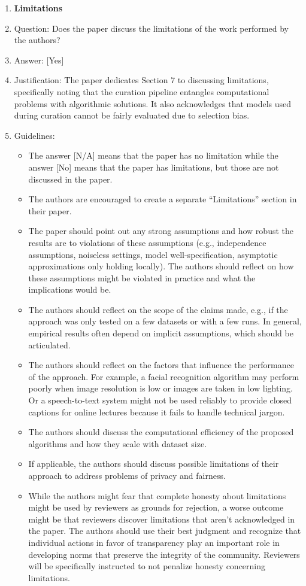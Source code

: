 \documentclass{llmxive}
\providecommand{\answerYes}[1][]{[Yes]#1}
\providecommand{\answerNo}[1][]{[No]#1}
\providecommand{\answerNA}[1][]{[N/A]#1}
\begin{document}
\begin{enumerate}
\item {\bf Limitations}
    \item[] Question: Does the paper discuss the limitations of the work performed by the authors?
    \item[] Answer: \answerYes{}
    \item[] Justification: The paper dedicates Section 7 to discussing limitations, specifically noting that the curation pipeline entangles computational problems with algorithmic solutions. It also acknowledges that models used during curation cannot be fairly evaluated due to selection bias.  
    \item[] Guidelines:
    \begin{itemize}
        \item The answer \answerNA{} means that the paper has no limitation while the answer \answerNo{} means that the paper has limitations, but those are not discussed in the paper. 
        \item The authors are encouraged to create a separate ``Limitations'' section in their paper.
        \item The paper should point out any strong assumptions and how robust the results are to violations of these assumptions (e.g., independence assumptions, noiseless settings, model well-specification, asymptotic approximations only holding locally). The authors should reflect on how these assumptions might be violated in practice and what the implications would be.
        \item The authors should reflect on the scope of the claims made, e.g., if the approach was only tested on a few datasets or with a few runs. In general, empirical results often depend on implicit assumptions, which should be articulated.
        \item The authors should reflect on the factors that influence the performance of the approach. For example, a facial recognition algorithm may perform poorly when image resolution is low or images are taken in low lighting. Or a speech-to-text system might not be used reliably to provide closed captions for online lectures because it fails to handle technical jargon.
        \item The authors should discuss the computational efficiency of the proposed algorithms and how they scale with dataset size.
        \item If applicable, the authors should discuss possible limitations of their approach to address problems of privacy and fairness.
        \item While the authors might fear that complete honesty about limitations might be used by reviewers as grounds for rejection, a worse outcome might be that reviewers discover limitations that aren't acknowledged in the paper. The authors should use their best judgment and recognize that individual actions in favor of transparency play an important role in developing norms that preserve the integrity of the community. Reviewers will be specifically instructed to not penalize honesty concerning limitations.
    \end{itemize}


\end{enumerate}
\end{document}
